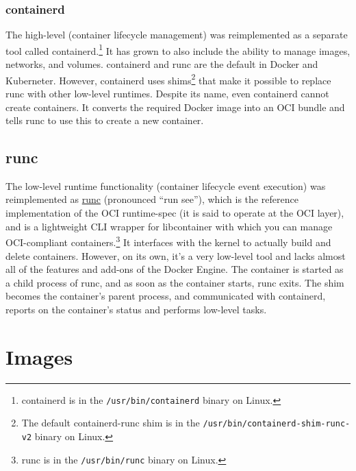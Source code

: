 \documentclass[8pt, table, xcdraw]{article}%
\begin{document}
\subsubsection{containerd}

The high-level (container lifecycle management) was reimplemented as a separate tool called containerd.\footnote{containerd is in the \lstinline{/usr/bin/containerd} binary on Linux.} It has grown to also include the ability to manage images, networks, and volumes. containerd and runc are the default in Docker and Kuberneter. However, containerd uses shims\footnote{The default containerd-runc shim is in the \lstinline{/usr/bin/containerd-shim-runc-v2} binary on Linux.} that make it possible to replace runc with other low-level runtimes. Despite its name, even containerd cannot create containers. It converts the required Docker image into an OCI bundle and tells runc to use this to create a new container.

\subsection{runc}

The low-level runtime functionality (container lifecycle event execution) was reimplemented as \href{https://github.com/opencontainers/runc}{runc} (pronounced “run see”), which is the reference implementation of the OCI runtime-spec (it is said to operate at the OCI layer), and is a lightweight CLI wrapper for libcontainer with which you can manage OCI-compliant containers.\footnote{runc is in the \lstinline{/usr/bin/runc} binary on Linux.} It interfaces with the kernel to actually build and delete containers. However, on its own, it's a very low-level tool and lacks almost all of the features and add-ons of the Docker Engine. The container is started as a child process of runc, and as soon as the container starts, runc exits. The shim becomes the container's parent process, and communicated with containerd, reports on the container’s status and performs low-level tasks.

\section{Images}
\end{document}
